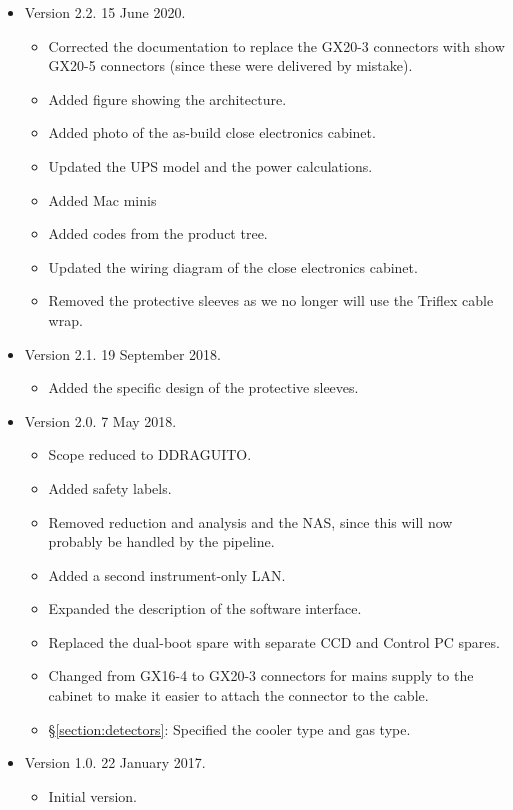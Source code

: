 \documentclass{article}
\begin{document}
\begin{itemize}
\item Version 2.2. 15 June 2020.

\begin{itemize}
\item Corrected the documentation to replace the GX20-3 connectors with show GX20-5 connectors (since these were delivered by mistake).
\item Added figure showing the architecture.
\item Added photo of the as-build close electronics cabinet.
\item Updated the UPS model and the power calculations.
\item Added Mac minis
\item Added codes from the product tree.
\item Updated the wiring diagram of the close electronics cabinet.
\item Removed the protective sleeves as we no longer will use the Triflex cable wrap.
\end{itemize}

\item Version 2.1. 19 September 2018.

\begin{itemize}
\item Added the specific design of the protective sleeves.
\end{itemize}

\item Version 2.0. 7 May 2018.

\begin{itemize}
\item Scope reduced to DDRAGUITO.
\item Added safety labels.
\item Removed reduction and analysis and the NAS, since this will now probably be handled by the pipeline.
\item Added a second instrument-only LAN.
\item Expanded the description of the software interface.
\item Replaced the dual-boot spare with separate CCD and Control PC spares.
\item Changed from GX16-4 to GX20-3 connectors for mains supply to the cabinet to make it easier to attach the connector to the cable.
\item \S\ref{section:detectors}: Specified the cooler type and gas type.
\end{itemize}


\item Version 1.0. 22 January 2017.

\begin{itemize}
\item Initial version.
\end{itemize}

\end{itemize}
\end{document}
